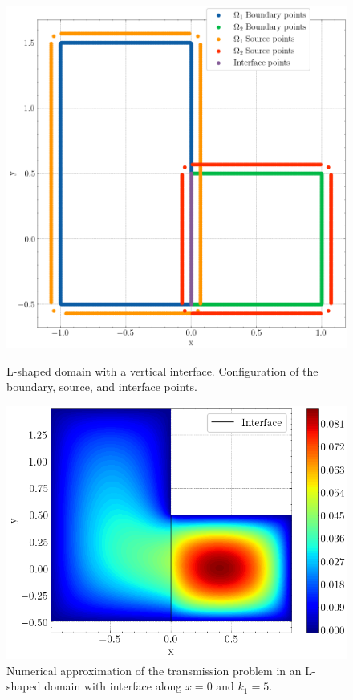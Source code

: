 \begin{figure}[!htb]
    \centering
    \begin{minipage}{.5\textwidth}
        \centering
        \includegraphics[width=0.75\linewidth]{Images/Transmission/L_shape_2_rectangles_col_points.png}
        \captionsetup{width=0.95\linewidth} %
        \caption{L-shaped domain with a vertical interface. Configuration of the boundary, source, and interface points.}
        \label{transmission_L_shape_config}
    \end{minipage}%
    \begin{minipage}{.5\textwidth}
        \centering
        \includegraphics[width=\linewidth]{Images/Transmission/L_shape_2_rectangles_k1_5.png}
        \captionsetup{width=\linewidth} %
        \caption{Numerical approximation of the transmission problem in an L-shaped domain with interface along \(x=0\) and \(k_1=5\).}
        \label{transmission_L_shape_k1_5}
    \end{minipage}
\end{figure}

